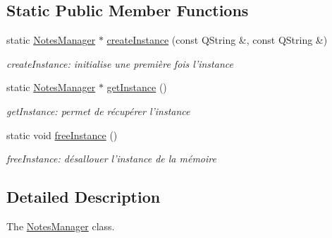 \subsection*{Static Public Member Functions}
\begin{DoxyCompactItemize}
\item 
static \hyperlink{classmanagers_1_1_notes_manager}{Notes\-Manager} $\ast$ \hyperlink{classmanagers_1_1_notes_manager_aa94402433f9c83d0347031fb5299ab0a}{create\-Instance} (const Q\-String \&, const Q\-String \&)
\begin{DoxyCompactList}\small\item\em create\-Instance\-: initialise une première fois l'instance \end{DoxyCompactList}\item 
static \hyperlink{classmanagers_1_1_notes_manager}{Notes\-Manager} $\ast$ \hyperlink{classmanagers_1_1_notes_manager_ad1a91e51ba8506c7ae7cd60d06bd075f}{get\-Instance} ()
\begin{DoxyCompactList}\small\item\em get\-Instance\-: permet de récupérer l'instance \end{DoxyCompactList}\item 
static void \hyperlink{classmanagers_1_1_notes_manager_ad8b2337027809f4a30ec697ac6f982bd}{free\-Instance} ()
\begin{DoxyCompactList}\small\item\em free\-Instance\-: désallouer l'instance de la mémoire \end{DoxyCompactList}\end{DoxyCompactItemize}


\subsection{Detailed Description}
The \hyperlink{classmanagers_1_1_notes_manager}{Notes\-Manager} class. 

